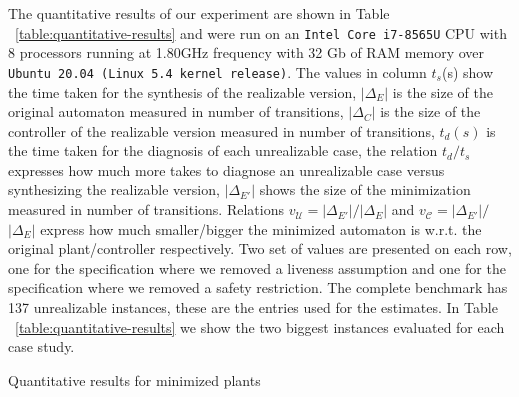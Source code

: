 The quantitative results of our experiment are shown in Table 
~\ref{table:quantitative-results} and were run on an 
\texttt{Intel\textsuperscript{\textregistered} Core\textsuperscript{\texttrademark}
 i7-8565U} CPU with 8 processors running at 1.80GHz frequency
with 32 Gb of RAM memory over \texttt{Ubuntu 20.04 (Linux 5.4 kernel release)}.
 The values in column $t_{s}$(s) show the time taken for the synthesis of the realizable version, $|\Delta_E|$ is the size of the original automaton measured in number of transitions, $|\Delta_C|$ is the size of the controller of the realizable version measured in number of transitions, $t_{d}(s)$ is the time taken for the diagnosis of each unrealizable case, the relation $t_{d}/t_{s}$ expresses how much more takes to diagnose an unrealizable case versus synthesizing the realizable version, $|\Delta_{E'}|$ shows the size of the  minimization measured in number of transitions. Relations $v_{\mathcal{U}}$$=$$|\Delta_{E'}|$$/$$|\Delta_{E}|$ and $v_{\mathcal{C}}$$=$$|\Delta_{E'}|$$/$$|\Delta_{E}|$ express how much smaller/bigger the minimized automaton is w.r.t. the original plant/controller respectively. Two set of values are presented on each row, one for the specification where we removed a liveness assumption and one for the specification where we removed a safety restriction.
 The complete benchmark has 137 unrealizable instances, these are the entries used for the estimates. 
In Table ~\ref{table:quantitative-results} we show the two biggest instances evaluated for each case study.
\begin{table*}
	\footnotesize
	\resizebox{\textwidth}{!} {

}
	\normalsize
  \caption{Quantitative results for minimized plants}
  \label{table:quantitative-results}
  \vspace{-1em}
 \end{table*}

